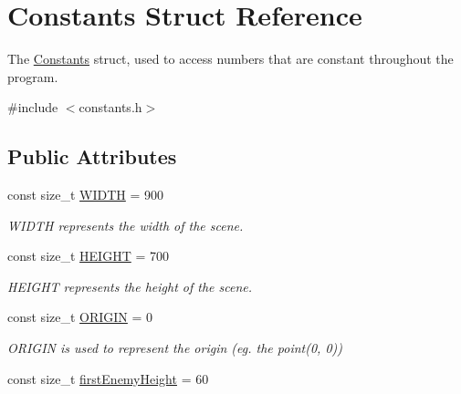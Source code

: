 \hypertarget{structConstants}{}\section{Constants Struct Reference}
\label{structConstants}


The \hyperlink{structConstants}{Constants} struct, used to access numbers that are constant throughout the program.  




{\ttfamily \#include $<$constants.\+h$>$}

\subsection*{Public Attributes}
\begin{DoxyCompactItemize}
\item 
\mbox{\label{structConstants_ad3d07dd54f58421e5b20f83f6edadf74}} 
const size\+\_\+t \hyperlink{structConstants_ad3d07dd54f58421e5b20f83f6edadf74}{W\+I\+D\+TH} = 900
\begin{DoxyCompactList}\small\item\em W\+I\+D\+TH represents the width of the scene. \end{DoxyCompactList}\item 
\mbox{\label{structConstants_a0205ca85f89c22f0eccb07001cf4612d}} 
const size\+\_\+t \hyperlink{structConstants_a0205ca85f89c22f0eccb07001cf4612d}{H\+E\+I\+G\+HT} = 700
\begin{DoxyCompactList}\small\item\em H\+E\+I\+G\+HT represents the height of the scene. \end{DoxyCompactList}\item 
\mbox{\label{structConstants_ab58d8adfff12e9aaf322207bf747a6a9}} 
const size\+\_\+t \hyperlink{structConstants_ab58d8adfff12e9aaf322207bf747a6a9}{O\+R\+I\+G\+IN} = 0
\begin{DoxyCompactList}\small\item\em O\+R\+I\+G\+IN is used to represent the origin (eg. the point(0, 0)) \end{DoxyCompactList}\item 
\mbox{\label{structConstants_ad04c5dd99fb2304ae86ac6a892849a26}} 
const size\+\_\+t \hyperlink{structConstants_ad04c5dd99fb2304ae86ac6a892849a26}{first\+Enemy\+Height} = 60

\end{DoxyCompactItemize}
